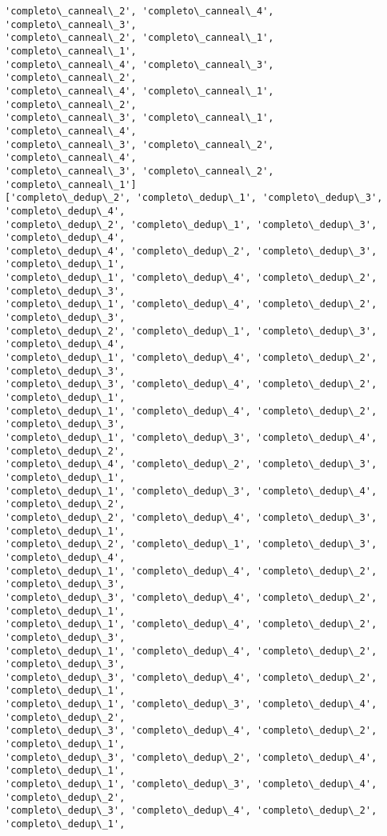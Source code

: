 \documentclass[11pt]{article}
\begin{document}
\begin{Verbatim}[commandchars=\\\{\}]
'completo\_canneal\_2', 'completo\_canneal\_4', 'completo\_canneal\_3',
'completo\_canneal\_2', 'completo\_canneal\_1', 'completo\_canneal\_1',
'completo\_canneal\_4', 'completo\_canneal\_3', 'completo\_canneal\_2',
'completo\_canneal\_4', 'completo\_canneal\_1', 'completo\_canneal\_2',
'completo\_canneal\_3', 'completo\_canneal\_1', 'completo\_canneal\_4',
'completo\_canneal\_3', 'completo\_canneal\_2', 'completo\_canneal\_4',
'completo\_canneal\_3', 'completo\_canneal\_2', 'completo\_canneal\_1']
['completo\_dedup\_2', 'completo\_dedup\_1', 'completo\_dedup\_3', 'completo\_dedup\_4',
'completo\_dedup\_2', 'completo\_dedup\_1', 'completo\_dedup\_3', 'completo\_dedup\_4',
'completo\_dedup\_4', 'completo\_dedup\_2', 'completo\_dedup\_3', 'completo\_dedup\_1',
'completo\_dedup\_1', 'completo\_dedup\_4', 'completo\_dedup\_2', 'completo\_dedup\_3',
'completo\_dedup\_1', 'completo\_dedup\_4', 'completo\_dedup\_2', 'completo\_dedup\_3',
'completo\_dedup\_2', 'completo\_dedup\_1', 'completo\_dedup\_3', 'completo\_dedup\_4',
'completo\_dedup\_1', 'completo\_dedup\_4', 'completo\_dedup\_2', 'completo\_dedup\_3',
'completo\_dedup\_3', 'completo\_dedup\_4', 'completo\_dedup\_2', 'completo\_dedup\_1',
'completo\_dedup\_1', 'completo\_dedup\_4', 'completo\_dedup\_2', 'completo\_dedup\_3',
'completo\_dedup\_1', 'completo\_dedup\_3', 'completo\_dedup\_4', 'completo\_dedup\_2',
'completo\_dedup\_4', 'completo\_dedup\_2', 'completo\_dedup\_3', 'completo\_dedup\_1',
'completo\_dedup\_1', 'completo\_dedup\_3', 'completo\_dedup\_4', 'completo\_dedup\_2',
'completo\_dedup\_2', 'completo\_dedup\_4', 'completo\_dedup\_3', 'completo\_dedup\_1',
'completo\_dedup\_2', 'completo\_dedup\_1', 'completo\_dedup\_3', 'completo\_dedup\_4',
'completo\_dedup\_1', 'completo\_dedup\_4', 'completo\_dedup\_2', 'completo\_dedup\_3',
'completo\_dedup\_3', 'completo\_dedup\_4', 'completo\_dedup\_2', 'completo\_dedup\_1',
'completo\_dedup\_1', 'completo\_dedup\_4', 'completo\_dedup\_2', 'completo\_dedup\_3',
'completo\_dedup\_1', 'completo\_dedup\_4', 'completo\_dedup\_2', 'completo\_dedup\_3',
'completo\_dedup\_3', 'completo\_dedup\_4', 'completo\_dedup\_2', 'completo\_dedup\_1',
'completo\_dedup\_1', 'completo\_dedup\_3', 'completo\_dedup\_4', 'completo\_dedup\_2',
'completo\_dedup\_3', 'completo\_dedup\_4', 'completo\_dedup\_2', 'completo\_dedup\_1',
'completo\_dedup\_3', 'completo\_dedup\_2', 'completo\_dedup\_4', 'completo\_dedup\_1',
'completo\_dedup\_1', 'completo\_dedup\_3', 'completo\_dedup\_4', 'completo\_dedup\_2',
'completo\_dedup\_3', 'completo\_dedup\_4', 'completo\_dedup\_2', 'completo\_dedup\_1',

\end{Verbatim}
\end{document}
